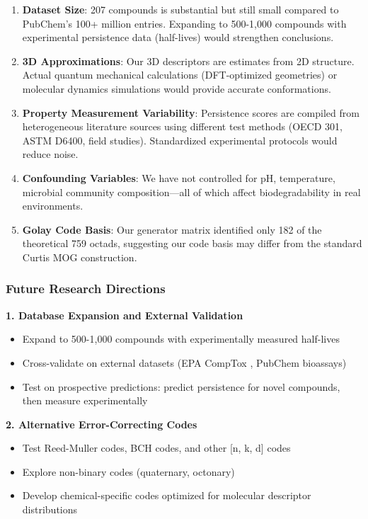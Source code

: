 \documentclass[11pt,letterpaper]{article}
\begin{document}
\begin{enumerate}
    \item \textbf{Dataset Size}: 207 compounds is substantial but still small compared to PubChem's 100+ million entries. Expanding to 500-1,000 compounds with experimental persistence data (half-lives) would strengthen conclusions.

    \item \textbf{3D Approximations}: Our 3D descriptors are estimates from 2D structure. Actual quantum mechanical calculations (DFT-optimized geometries) or molecular dynamics simulations would provide accurate conformations.

    \item \textbf{Property Measurement Variability}: Persistence scores are compiled from heterogeneous literature sources using different test methods (OECD 301, ASTM D6400, field studies). Standardized experimental protocols would reduce noise.

    \item \textbf{Confounding Variables}: We have not controlled for pH, temperature, microbial community composition—all of which affect biodegradability in real environments.

    \item \textbf{Golay Code Basis}: Our generator matrix identified only 182 of the theoretical 759 octads, suggesting our code basis may differ from the standard Curtis MOG construction.
\end{enumerate}

\subsubsection{Future Research Directions}

\textbf{1. Database Expansion and External Validation}

\begin{itemize}
    \item Expand to 500-1,000 compounds with experimentally measured half-lives
    \item Cross-validate on external datasets (EPA CompTox \cite{williams2017comptox}, PubChem bioassays)
    \item Test on prospective predictions: predict persistence for novel compounds, then measure experimentally
\end{itemize}

\textbf{2. Alternative Error-Correcting Codes}

\begin{itemize}
    \item Test Reed-Muller codes, BCH codes, and other [n, k, d] codes
    \item Explore non-binary codes (quaternary, octonary)
    \item Develop chemical-specific codes optimized for molecular descriptor distributions
\end{itemize}
\end{document}
